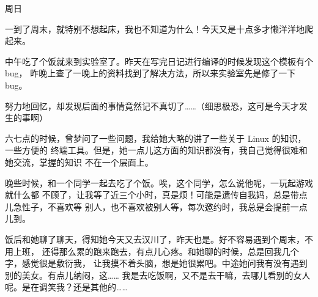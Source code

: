

周日

一到了周末，就特别不想起床，我也不知道为什么！今天又是十点多才懒洋洋地爬起来。

中午吃了个饭就来到实验室了。昨天在写完日记进行编译的时候发现这个模板有个 bug，
昨晚上查了一晚上的资料找到了解决方法，所以来实验室先是修了一下 bug。

努力地回忆，却发现后面的事情竟然记不真切了……（细思极恐，这可是今天才发生的事啊）

六七点的时候，曾梦问了一些问题，我给她大略的讲了一些关于 Linux 的知识，一些方便的
终端工具。但是，她一点儿这方面的知识都没有，我自己觉得很难和她交流，掌握的知识
不在一个层面上。

晚些时候，和一个同学一起去吃了个饭。唉，这个同学，怎么说他呢，一玩起游戏就什么都
不顾了，让我等了近三个小时，真是烦！可能是遗传自我妈，总是带点儿急性子，不喜欢等
别人，也不喜欢被别人等，每次邀约时，我总是会提前一点儿到。

饭后和她聊了聊天，得知她今天又去汉川了，昨天也是。好不容易遇到个周末，不用上班，
还得那么累的跑来跑去，有点儿心疼。和她聊的时候，总是回我几个字，感觉很是敷衍我，
让我摸不着头脑，想是她很累吧。中途她问我有没有遇到别的美女。有点儿纳闷，这……
我是去吃饭啊，又不是去干嘛，去哪儿看别的女人呢。是在调笑我？还是其他的……
